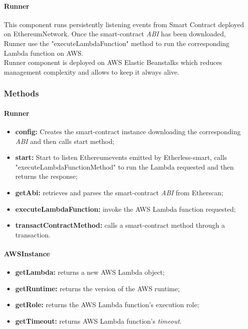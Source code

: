 \paragraph{Runner}
This component runs persistently listening events from Smart Contract deployed on Ethereum\glo Network. Once the smart-contract \textit{ABI\glo} has been downloaded, Runner use the "executeLambdaFunction" method to run the corresponding Lambda function on AWS.\\ Runner component is deployed on AWS Elastic Beanstalks which reduces management complexity and allows to keep it always alive.


\subsubsection{Methods}
\paragraph{Runner}
\begin{itemize}
	\item \textbf{config:} Creates the smart-contract instance downloading the corresponding \textit{ABI\glo} and then calls start method;
	\item \textbf{start:} Start to listen Ethereum\glo events emitted by Etherless-smart, calls "executeLambdaFunctionMethod" to run the Lambda requested and then returns the response;
	\item \textbf{getAbi:} retrieves and parses the smart-contract \textit{ABI\glo} from Etherscan;
	\item \textbf{executeLambdaFunction:} invoke the AWS Lambda function requested;
	\item \textbf{transactContractMethod:} calls a smart-contract method through a transaction.
\end{itemize}
\paragraph{AWSInstance}
\begin{itemize}
	\item \textbf{getLambda:} returns a new AWS Lambda object;
	\item \textbf{getRuntime:} returns the version of the AWS runtime;
	\item \textbf{getRole:} returns the AWS Lambda function's execution role;
	\item \textbf{getTimeout:} returns AWS Lambda function's \textit{timeout\glos}.
\end{itemize}
